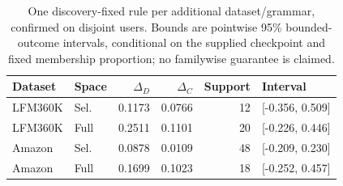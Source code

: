 \begin{table}[t]
\centering
\caption{One discovery-fixed rule per additional dataset/grammar, confirmed on disjoint users. Bounds are pointwise 95\% bounded-outcome intervals, conditional on the supplied checkpoint and fixed membership proportion; no familywise guarantee is claimed.}
\label{tab:additional-confirmation}
\small
\begin{tabular}{llrrrl}
\toprule
Dataset & Space & $\Delta_D$ & $\Delta_C$ & Support & Interval \\
\midrule
LFM360K & Sel. & 0.1173 & 0.0766 & 12 & [-0.356, 0.509] \\
LFM360K & Full & 0.2511 & 0.1101 & 20 & [-0.226, 0.446] \\
Amazon & Sel. & 0.0878 & 0.0109 & 48 & [-0.209, 0.230] \\
Amazon & Full & 0.1699 & 0.1023 & 18 & [-0.252, 0.457] \\
\bottomrule
\end{tabular}
\end{table}
